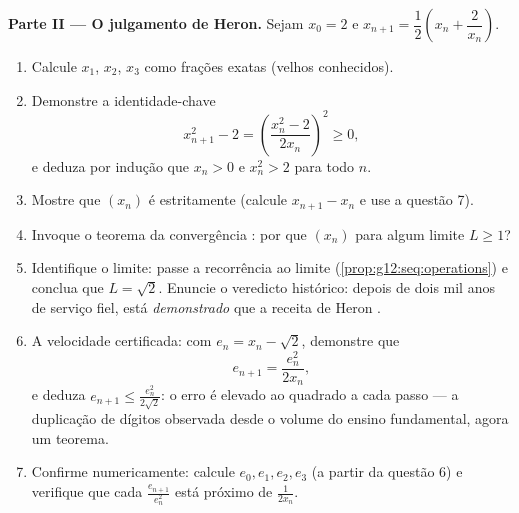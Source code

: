\begin{problem}
\medskip
\noindent\textbf{Parte II --- O julgamento de Heron.}
Sejam $x_0 = 2$ e $x_{n+1} = \dfrac12\left(x_n +
\dfrac{2}{x_n}\right)$.
\begin{enumerate}[resume]
  \item Calcule $x_1$, $x_2$, $x_3$ como frações exatas (velhos
        conhecidos).
  \item Demonstre a identidade-chave
        \[
        x_{n+1}^2 - 2 = \left(\frac{x_n^2 - 2}{2x_n}\right)^{\!2}
        \geq 0,
        \]
        e deduza por indução que $x_n > 0$ e $x_n^2 > 2$ para
        todo $n$.
  \item Mostre que $(x_n)$ é estritamente  (calcule
        $x_{n+1} - x_n$ e use a questão 7).
  \item Invoque o teorema da convergência : por que
        $(x_n)$  para algum limite $L \geq 1$?
  \item Identifique o limite: passe a recorrência ao limite
        (\cref{prop:g12:seq:operations}) e conclua que
        $L = \sqrt2$. Enuncie o veredicto histórico: depois de
        dois mil anos de serviço fiel, está \emph{demonstrado}
        que a receita de Heron .
  \item A velocidade certificada: com $e_n = x_n - \sqrt2$,
        demonstre que
        \[
        e_{n+1} = \frac{e_n^2}{2 x_n} ,
        \]
        e deduza $e_{n+1} \leq \frac{e_n^2}{2\sqrt2}$: o erro é
        elevado ao quadrado a cada passo --- a duplicação de
        dígitos observada desde o volume do ensino fundamental,
        agora um teorema.
  \item Confirme numericamente: calcule $e_0, e_1, e_2, e_3$ (a
        partir da questão 6) e verifique que cada
        $\frac{e_{n+1}}{e_n^2}$ está próximo de
        $\frac{1}{2x_n}$.
\end{enumerate}


\end{problem}
